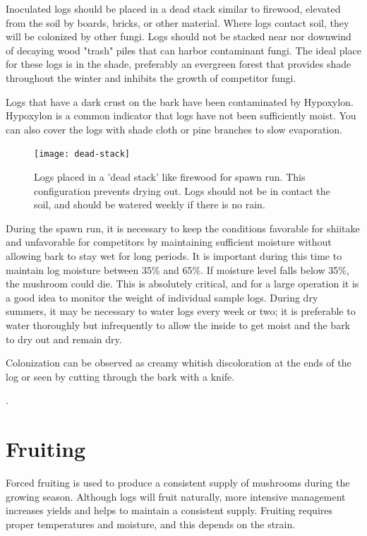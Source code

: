 \documentclass{tufte-handout}
\begin{document}
Inoculated logs should be placed in a dead stack similar to firewood, elevated from the soil by boards, bricks, or other material. 
Where logs contact soil, they will be colonized by other fungi. 
Logs should not be stacked near nor downwind of decaying wood "trash" piles that can harbor contaminant fungi.
The ideal place for these logs is in the shade, preferably an evergreen forest that provides shade throughout the winter and inhibits the growth of competitor fungi.

Logs that have a dark crust on the bark have been contaminated by Hypoxylon. 
Hypoxylon is a common indicator that logs have not been sufficiently moist.
You can also cover the logs with shade cloth or pine branches to slow evaporation.


\begin{figure}
\texttt{[image: dead-stack]}
\caption{Logs placed in a 'dead stack' like firewood for spawn run. This configuration prevents drying out. Logs should not be in contact the soil, and should be watered weekly if there is no rain.}
\end{figure}

During the spawn run, it is necessary to keep the conditions favorable for shiitake and unfavorable for competitors by maintaining sufficient moisture without allowing bark to stay wet for long periods. It is important during this time to maintain log moisture between 35\% and 65\%. 
If moisture level falls below 35\%, the mushroom could die.
This is absolutely critical, and for a large operation it is a good idea to monitor the weight of individual sample logs. 
During dry summers, it may be necessary to water logs every week or two; it is preferable to water thoroughly but infrequently to allow the inside to get moist and the bark to dry out and remain dry. 

Colonization can be observed as creamy whitish discoloration at the ends of the log or seen by cutting through the bark with a knife.

. 
\section{Fruiting}

Forced fruiting is used to produce a consistent supply of mushrooms during the growing season. 
Although logs will fruit naturally, more intensive management increases yields and helps to maintain a consistent supply. Fruiting requires proper temperatures and moisture, and this depends on the strain.
\end{document}

